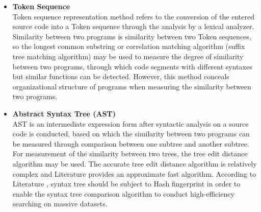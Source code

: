 \begin{itemize}

	\item \textbf{Token Sequence} \\
	Token sequence representation method refers to the conversion of the entered source code into a Token sequence through the analysis by a lexical analyzer. Similarity between two programs is similarity between two Token sequences, so the longest common substring or correlation matching algorithm (suffix tree matching algorithm) may be used to measure the degree of similarity between two programs, through which code segments with different syntaxes but similar functions can be detected. However, this method conceals organizational structure of programs when measuring the similarity between two programs.

	\item \textbf{Abstract Syntax Tree (AST)} \\
	AST is an intermediate expression form after syntactic analysis on a source code is conducted, based on which the similarity between two programs can be measured through comparison between one subtree and another subtree. For measurement of the similarity between two trees, the tree edit distance algorithm \cite{zhang1989simple} may be used. The accurate tree edit distance algorithm is relatively complex and Literature \cite{guha2002approximate} provides an approximate fast algorithm. According to Literature \cite{chilowicz2009syntax}, syntax tree should be subject to Hash fingerprint in order to enable the syntax tree comparison algorithm to conduct high-efficiency searching on massive datasets. 
	


\end{itemize}
